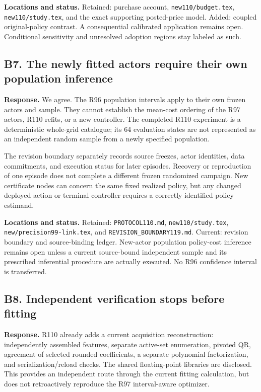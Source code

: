 \textbf{Locations and status.} Retained: purchase account, \nolinkurl{new110/budget.tex}, \nolinkurl{new110/study.tex}, and the exact supporting posted-price model. Added: coupled original-policy contrast. A consequential calibrated application remains open. Conditional sensitivity and unresolved adoption regions stay labeled as such.

\hypertarget{b7.-the-newly-fitted-actors-require-their-own-population-inference}{%
\subsection{B7. The newly fitted actors require their own population inference}\label{b7.-the-newly-fitted-actors-require-their-own-population-inference}}

\textbf{Response.} We agree. The R96 population intervals apply to their own frozen actors and sample. They cannot establish the mean-cost ordering of the R97 actors, R110 refits, or a new controller. The completed R110 experiment is a deterministic whole-grid catalogue; its 64 evaluation states are not represented as an independent random sample from a newly specified population.

The revision boundary separately records source freezes, actor identities, data commitments, and execution status for later episodes. Recovery or reproduction of one episode does not complete a different frozen randomized campaign. New certificate nodes can concern the same fixed realized policy, but any changed deployed action or terminal controller requires a correctly identified policy estimand.

\textbf{Locations and status.} Retained: \nolinkurl{PROTOCOL110.md}, \nolinkurl{new110/study.tex}, \nolinkurl{new/precision99-link.tex}, and \nolinkurl{REVISION_BOUNDARY119.md}. Current: revision boundary and source-binding ledger. New-actor population policy-cost inference remains open unless a current source-bound independent sample and its prescribed inferential procedure are actually executed. No R96 confidence interval is transferred.

\hypertarget{b8.-independent-verification-stops-before-fitting}{%
\subsection{B8. Independent verification stops before fitting}\label{b8.-independent-verification-stops-before-fitting}}

\textbf{Response.} R110 already adds a current acquisition reconstruction: independently assembled features, separate active-set enumeration, pivoted QR, agreement of selected rounded coefficients, a separate polynomial factorization, and serialization/reload checks. The shared floating-point libraries are disclosed. This provides an independent route through the current fitting calculation, but does not retroactively reproduce the R97 interval-aware optimizer.

